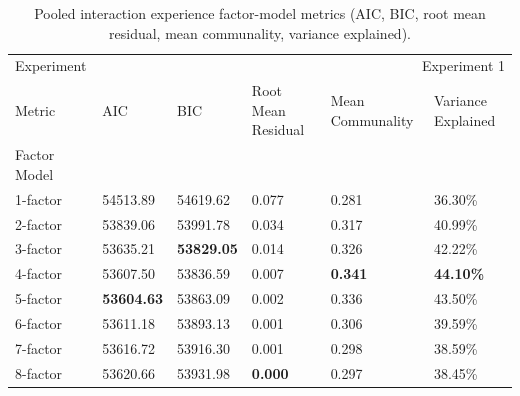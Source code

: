 \begin{table}
\caption{Pooled interaction experience factor-model metrics (AIC, BIC, root mean residual, mean communality, variance explained).}
\label{tab:pooled_interaction_factor_metrics}
\begin{tabular}{llllll}
\toprule
Experiment & \multicolumn{5}{r}{Experiment 1} \\
Metric & AIC & BIC & Root Mean Residual & Mean Communality & Variance Explained \\
Factor Model &  &  &  &  &  \\
\midrule
1-factor & 54513.89 & 54619.62 & 0.077 & 0.281 & 36.30\% \\
2-factor & 53839.06 & 53991.78 & 0.034 & 0.317 & 40.99\% \\
3-factor & 53635.21 & \textbf{53829.05} & 0.014 & 0.326 & 42.22\% \\
4-factor & 53607.50 & 53836.59 & 0.007 & \textbf{0.341} & \textbf{44.10\%} \\
5-factor & \textbf{53604.63} & 53863.09 & 0.002 & 0.336 & 43.50\% \\
6-factor & 53611.18 & 53893.13 & 0.001 & 0.306 & 39.59\% \\
7-factor & 53616.72 & 53916.30 & 0.001 & 0.298 & 38.59\% \\
8-factor & 53620.66 & 53931.98 & \textbf{0.000} & 0.297 & 38.45\% \\
\bottomrule
\end{tabular}
\end{table}
